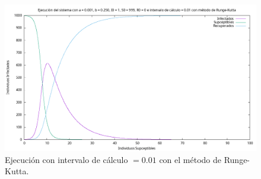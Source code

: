 \documentclass[12pt, spanish]{article}
\begin{document}
\begin{figure}[H]
	\centering
			\includegraphics[width=\textwidth]{SIR_001_runge.png}
			\caption{Ejecución con intervalo de cálculo $= 0.01$ con el método de Runge-Kutta.}
\end{figure}




%
%
\end{document}

